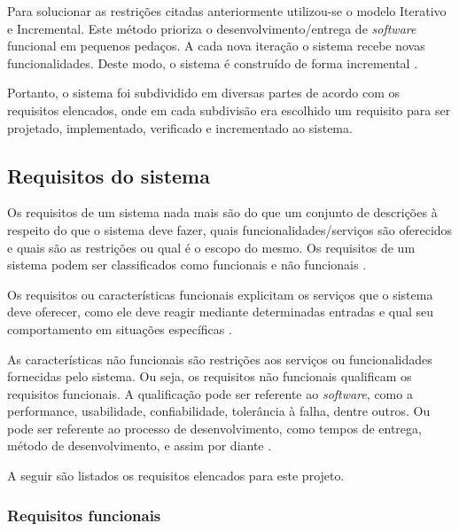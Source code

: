 Para solucionar as restrições citadas anteriormente utilizou-se o modelo Iterativo e Incremental. Este método prioriza o desenvolvimento/entrega de \textit{software} funcional em pequenos pedaços. A cada nova iteração o sistema recebe novas funcionalidades. Deste modo, o sistema é construído de forma incremental \cite{SITEINTERATIVOINCREMENTAL}.

Portanto, o sistema foi subdividido em diversas partes de acordo com os requisitos elencados, onde em cada subdivisão era escolhido um requisito para ser projetado, implementado, verificado e incrementado ao sistema.

\subsection{Requisitos do sistema} \label{subsec:requisitos}

Os requisitos de um sistema nada mais são do que um conjunto de descrições à respeito do que o sistema deve fazer, quais funcionalidades/serviços são oferecidos e quais são as restrições ou qual é o escopo do mesmo. Os requisitos de um sistema podem ser classificados como funcionais e não funcionais \cite{sommerville2011engenharia}.

Os requisitos ou características funcionais explicitam os serviços que o sistema deve oferecer, como ele deve reagir mediante determinadas entradas e qual seu comportamento em situações específicas \cite{sommerville2011engenharia, engsoftwilson}.

As características não funcionais são restrições aos serviços ou funcionalidades fornecidas pelo sistema. Ou seja, os requisitos não funcionais qualificam os requisitos funcionais. A qualificação pode ser referente ao \textit{software}, como a performance, usabilidade, confiabilidade, tolerância à falha, dentre outros. Ou pode ser referente ao processo de desenvolvimento, como tempos de entrega, método de desenvolvimento, e assim por diante \cite{introrequisitos}.

A seguir são listados os requisitos elencados para este projeto.


\subsubsection{Requisitos funcionais}

